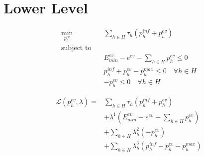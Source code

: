 \section{Lower Level}

\begin{align*}
	\min_{p^{ev}_h} \quad   & \sum_{h\in H} \tau_h(p^{inf}_{h} + p^{ev}_{h})                     \\
	\text{subject to} \quad &                                                                    \\
	                        & E^{ev}_{min} - e^{ev} -\sum_{h\in H} p^{ev}_{h}\leq 0              \\
	                        & p^{inf}_{h} + p^{ev}_{h} - p^{max}_{h}\leq 0 \quad \forall h \in H \\
                            & -p^{ev}_{h}\leq 0 \quad \forall h \in H
\end{align*}

\begin{align*}
	\mathcal{L}(p^{ev}_h, \lambda) =
	 & \sum_{h \in H} \tau_h(p^{inf}_h + p^{ev}_h)                                  \\
	 & + \lambda^1 \left( E^{ev}_{min} - e^{ev} - \sum_{h \in H} p^{ev}_h \right)   \\
     & + \sum_{h \in H} \lambda^2_h \left( - p^{ev}_h \right)   \\
	 & + \sum_{h \in H} \lambda^3_h \left( p^{inf}_h + p^{ev}_h - p^{max}_h \right)
\end{align*}

